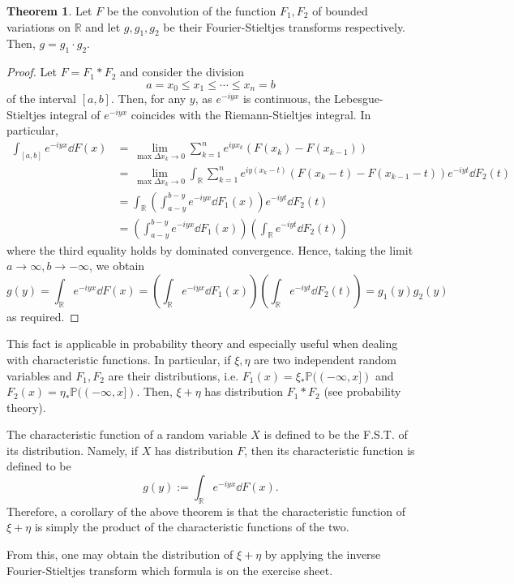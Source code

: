 \documentclass[]{article}
\theoremstyle{definition}
\newtheorem{theorem}{Theorem}
\theoremstyle{definition}
\begin{document}
\begin{theorem}
  Let \(F\) be the convolution of the function \(F_1, F_2\) of bounded 
  variations on \(\mathbb{R}\) and let \(g, g_1, g_2\) be their Fourier-Stieltjes 
  transforms respectively. Then, \(g = g_1 \cdot g_2\).
\end{theorem}
\begin{proof}
  Let \(F = F_1 * F_2\) and consider the division 
  \[a = x_0 \le x_1 \le \cdots \le x_n = b\]
  of the interval \([a, b]\). Then, for any \(y\), as \(e^{-iyx}\) is continuous,
  the Lebesgue-Stieltjes integral of \(e^{-iyx}\) coincides with the 
  Riemann-Stieltjes integral. In particular, 
  \[\begin{split}
    \int_{[a, b]} e^{-iyx} \dd F(x) 
    & = \lim_{\max \Delta x_k \to 0} \sum_{k = 1}^n e^{iyx_k} (F(x_k) - F(x_{k - 1}))\\
    & = \lim_{\max \Delta x_k \to 0} \int_{\mathbb{R}}\sum_{k = 1}^n e^{iy(x_k - t)} 
      (F(x_k - t) - F(x_{k - 1} - t)) e^{-iyt} \dd F_2(t)\\
    & = \int_{\mathbb{R}} \left(\int_{a - y}^{b - y} e^{-iyx}\dd F_1(x)\right)
      e^{-iyt} \dd F_2(t)\\
    & = \left(\int_{a - y}^{b - y} e^{-iyx}\dd F_1(x)\right)
      \left(\int_{\mathbb{R}} e^{-iyt} \dd F_2(t)\right)
  \end{split}\]
  where the third equality holds by dominated convergence. Hence, 
  taking the limit \(a \to \infty, b \to -\infty\), we obtain 
  \[g(y) = \int_{\mathbb{R}} e^{-iyx} \dd F(x) 
    = \left(\int_{\mathbb{R}} e^{-iyx}\dd F_1(x)\right)
    \left(\int_{\mathbb{R}} e^{-iyt} \dd F_2(t)\right) = g_1(y)g_2(y)\]
  as required.
\end{proof}

This fact is applicable in probability theory and especially useful when dealing 
with characteristic functions. In particular, if \(\xi, \eta\) are two independent 
random variables and \(F_1, F_2\) are their distributions, i.e. 
\(F_1(x) = \xi_* \mathbb{P}((-\infty, x])\) and \(F_2(x) = \eta_* \mathbb{P}((-\infty, x])\).
Then, \(\xi + \eta\) has distribution \(F_1 * F_2\) (see probability theory).

The characteristic function of a random variable \(X\) is defined to be the 
F.S.T. of its distribution. Namely, if \(X\) has distribution \(F\), 
then its characteristic function is defined to be 
\[g(y) := \int_{\mathbb{R}} e^{-i y x} \dd F(x).\]
Therefore, a corollary of the above theorem is that the characteristic function 
of \(\xi + \eta\) is simply the product of the characteristic functions of the 
two.

From this, one may obtain the distribution of \(\xi + \eta\) by applying the 
inverse Fourier-Stieltjes transform which formula is on the exercise sheet.
\end{document}
